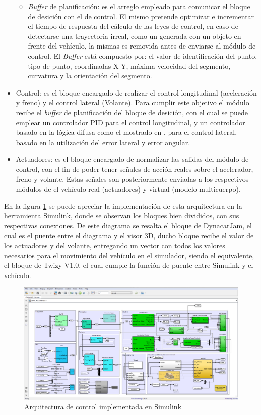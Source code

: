 \begin{itemize}
\begin{itemize}
	\item \textit{ Buffer} de planificación: es el arreglo empleado para comunicar el bloque de desición con el de control. El mismo pretende optimizar e incrementar el tiempo de respuesta del cálculo de las leyes de control, en caso de detectarse una trayectoria irreal, como un generada con un objeto en frente del vehículo, la mismas es removida antes de enviarse al módulo de control. El \textit{Buffer} está compuesto por: el valor de identificación del punto, tipo de punto, coordinadas X-Y, máxima velocidad del segmento, curvatura y la orientación del segmento.    
	\end{itemize}
	\item Control: es el bloque encargado de realizar el control longitudinal (aceleración y freno) y el control lateral (Volante). Para cumplir este objetivo el módulo recibe el \textit{buffer} de planificación del bloque de desición, con el cual se puede emplear un controlador PID para el control longitudinal, y un controlador basado en la lógica difusa como el mostrado en \cite{perez2013trajectory}, para el control lateral, basado en la utilización del error lateral y error angular. 
	\item Actuadores: es el bloque encargado de normalizar las salidas del módulo de control, con el fin de poder tener señales de acción reales sobre el acelerador, freno y volante. Estas señales son posteriormente enviadas a los respectivos módulos de el vehículo real (actuadores) y virtual (modelo multicuerpo).
\end{itemize} 

\par En la figura \ref{fig:dyna} se puede apreciar la implementación de esta arquitectura en la herramienta Simulink, donde se observan los bloques bien divididos, con sus respectivas conexiones. De este diagrama se resalta el bloque de DynacarJam, el cual es el puente entre el diagrama y el visor 3D, ducho bloque recibe el valor de los actuadores y del volante, entregando un vector con todos los valores necesarios para el movimiento del vehículo en el simulador, siendo el equivalente, el bloque de Twizy V1.0, el cual cumple la función de puente entre Simulink y el vehículo.  	
   
\begin{figure}[!h]
	\centering
		\includegraphics[scale=0.35]{Imagenes/dyna}
		\caption{Arquitectura de control implementada en Simulink}
		\label{fig:dyna}
\end{figure}	
